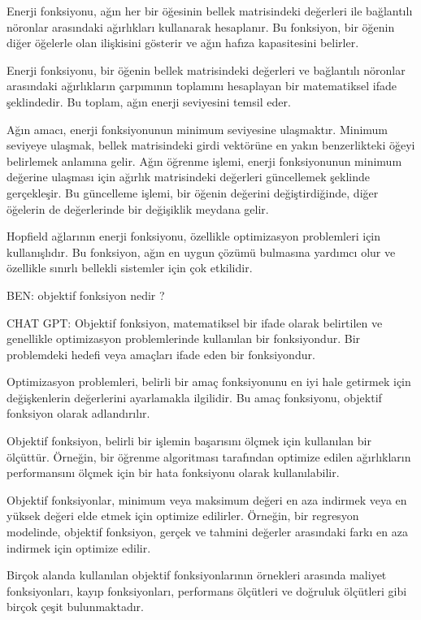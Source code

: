 \documentclass[11pt]{article}
\begin{document}
Enerji fonksiyonu, ağın her bir öğesinin bellek matrisindeki değerleri ile bağlantılı nöronlar arasındaki ağırlıkları kullanarak hesaplanır. Bu fonksiyon, bir öğenin diğer öğelerle olan ilişkisini gösterir ve ağın hafıza kapasitesini belirler.

Enerji fonksiyonu, bir öğenin bellek matrisindeki değerleri ve bağlantılı nöronlar arasındaki ağırlıkların çarpımının toplamını hesaplayan bir matematiksel ifade şeklindedir. Bu toplam, ağın enerji seviyesini temsil eder.

Ağın amacı, enerji fonksiyonunun minimum seviyesine ulaşmaktır. Minimum seviyeye ulaşmak, bellek matrisindeki girdi vektörüne en yakın benzerlikteki öğeyi belirlemek anlamına gelir.
Ağın öğrenme işlemi, enerji fonksiyonunun minimum değerine ulaşması için ağırlık matrisindeki değerleri güncellemek şeklinde gerçekleşir. Bu güncelleme işlemi, bir öğenin değerini değiştirdiğinde, diğer öğelerin de değerlerinde bir değişiklik meydana gelir.

Hopfield ağlarının enerji fonksiyonu, özellikle optimizasyon problemleri için kullanışlıdır. Bu fonksiyon, ağın en uygun çözümü bulmasına yardımcı olur ve özellikle sınırlı bellekli sistemler için çok etkilidir.

BEN: objektif fonksiyon nedir ?

CHAT GPT: Objektif fonksiyon, matematiksel bir ifade olarak belirtilen ve genellikle optimizasyon problemlerinde kullanılan bir fonksiyondur. Bir problemdeki hedefi veya amaçları ifade eden bir fonksiyondur.

Optimizasyon problemleri, belirli bir amaç fonksiyonunu en iyi hale getirmek için değişkenlerin değerlerini ayarlamakla ilgilidir. Bu amaç fonksiyonu, objektif fonksiyon olarak adlandırılır.

Objektif fonksiyon, belirli bir işlemin başarısını ölçmek için kullanılan bir ölçüttür. Örneğin, bir öğrenme algoritması tarafından optimize edilen ağırlıkların performansını ölçmek için bir hata fonksiyonu olarak kullanılabilir.

Objektif fonksiyonlar, minimum veya maksimum değeri en aza indirmek veya en yüksek değeri elde etmek için optimize edilirler. Örneğin, bir regresyon modelinde, objektif fonksiyon, gerçek ve tahmini değerler arasındaki farkı en aza indirmek için optimize edilir.

Birçok alanda kullanılan objektif fonksiyonlarının örnekleri arasında maliyet fonksiyonları, kayıp fonksiyonları, performans ölçütleri ve doğruluk ölçütleri gibi birçok çeşit bulunmaktadır.
\end{document}
